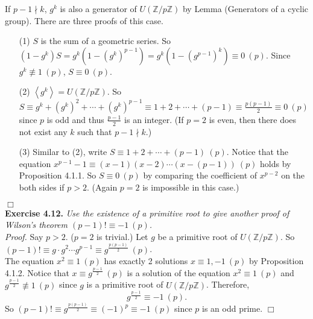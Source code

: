 \documentclass{article}
\begin{document}
If $p - 1 \nmid k$, $g^k$ is also a generator of $U(\mathbb{Z}/p\mathbb{Z})$
by Lemma (Generators of a cyclic group).
There are three proofs of this case.
\begin{enumerate}
\item[(1)]
$S$ is the sum of a geometric series.
So $(1 - g^k) S = g^k (1 - (g^k)^{p - 1}) = g^k (1 - (g^{p - 1})^k) \equiv 0 \: (p)$.
Since $g^k \not\equiv 1 \: (p)$, $S \equiv 0 \: (p)$.
\item[(2)]
$\left \langle g^k \right \rangle = U(\mathbb{Z}/p\mathbb{Z})$. So
$S \equiv g^k + (g^k)^2 + \cdots + (g^k)^{p - 1} \equiv 1 + 2 + \cdots + (p - 1)
\equiv \frac{p(p - 1)}{2} \equiv 0 \: (p)$ since $p$ is odd and
thus $\frac{p - 1}{2}$ is an integer.
(If $p = 2$ is even, then there does not exist any $k$ such that $p - 1 \nmid k$.)
\item[(3)]
Similar to (2), write $S \equiv 1 + 2 + \cdots + (p - 1) \: (p)$. Notice that the equation
$x^{p - 1} - 1 \equiv (x - 1)(x - 2) \cdots (x - (p - 1)) \: (p)$ holds by Proposition 4.1.1.
So $S \equiv 0 \: (p)$ by comparing the coefficient of $x^{p - 2}$ on the both sides if $p > 2$.
(Again $p = 2$ is impossible in this case.)
\end{enumerate}

$\Box$ \\



\textbf{Exercise 4.12.} \emph{Use the existence of a primitive root to give another proof
of Wilson's theorem $(p - 1)! \equiv -1 \: (p)$.} \\

\emph{Proof.}
Say $p > 2$. ($p = 2$ is trivial.)
Let $g$ be a primitive root of $U(\mathbb{Z}/p\mathbb{Z})$.
So $(p - 1)! \equiv g \cdot g^2 \cdots g^{p - 1} \equiv g^{\frac{p(p - 1)}{2}} \: (p)$. \\

The equation $x^2 \equiv 1 \: (p)$ has exactly 2 solutions $x \equiv 1, -1 \: (p)$
by Proposition 4.1.2.
Notice that $x \equiv g^{\frac{p - 1}{2}} \: (p)$ is a solution of the equation
$x^2 \equiv 1 \: (p)$ and $g^{\frac{p - 1}{2}} \not\equiv 1 \: (p)$
since $g$ is a primitive root of $U(\mathbb{Z}/p\mathbb{Z})$.
Therefore, $$g^{\frac{p - 1}{2}} \equiv -1 \: (p).$$
So $(p - 1)! \equiv g^{\frac{p(p - 1)}{2}} \equiv (-1)^p \equiv -1 \: (p)$
since $p$ is an odd prime.
$\Box$ \\
\end{document}
